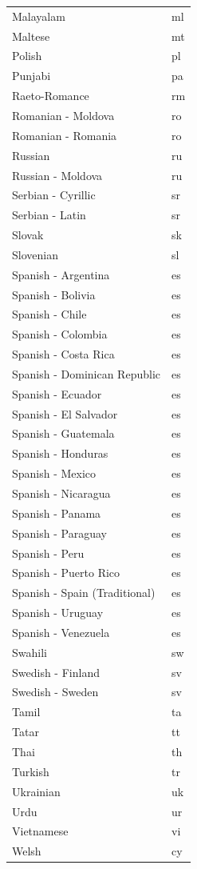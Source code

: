 \documentclass[
  12pt,
]{krantz}
\begin{document}
\begin{longtable}{ll}
Malayalam & ml\\
Maltese & mt\\
Polish & pl\\
Punjabi & pa\\
\addlinespace
Raeto-Romance & rm\\
Romanian - Moldova & ro\\
Romanian - Romania & ro\\
Russian & ru\\
Russian - Moldova & ru\\
\addlinespace
Serbian - Cyrillic & sr\\
Serbian - Latin & sr\\
Slovak & sk\\
Slovenian & sl\\
Spanish - Argentina & es\\
\addlinespace
Spanish - Bolivia & es\\
Spanish - Chile & es\\
Spanish - Colombia & es\\
Spanish - Costa Rica & es\\
Spanish - Dominican Republic & es\\
\addlinespace
Spanish - Ecuador & es\\
Spanish - El Salvador & es\\
Spanish - Guatemala & es\\
Spanish - Honduras & es\\
Spanish - Mexico & es\\
\addlinespace
Spanish - Nicaragua & es\\
Spanish - Panama & es\\
Spanish - Paraguay & es\\
Spanish - Peru & es\\
Spanish - Puerto Rico & es\\
\addlinespace
Spanish - Spain (Traditional) & es\\
Spanish - Uruguay & es\\
Spanish - Venezuela & es\\
Swahili & sw\\
Swedish - Finland & sv\\
\addlinespace
Swedish - Sweden & sv\\
Tamil & ta\\
Tatar & tt\\
Thai & th\\
Turkish & tr\\
\addlinespace
Ukrainian & uk\\
Urdu & ur\\
Vietnamese & vi\\
Welsh & cy\\*
\end{longtable}
\end{document}
